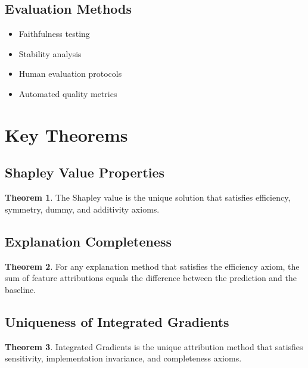 \documentclass[11pt]{article}
\theoremstyle{definition}
\newtheorem{theorem}{Theorem}[section]
\begin{document}
\subsection{Evaluation Methods}
\begin{itemize}
    \item Faithfulness testing
    \item Stability analysis
    \item Human evaluation protocols
    \item Automated quality metrics
\end{itemize}

\section{Key Theorems}

\subsection{Shapley Value Properties}
\begin{theorem}
The Shapley value is the unique solution that satisfies efficiency, symmetry, dummy, and additivity axioms.
\end{theorem}

\subsection{Explanation Completeness}
\begin{theorem}
For any explanation method that satisfies the efficiency axiom, the sum of feature attributions equals the difference between the prediction and the baseline.
\end{theorem}

\subsection{Uniqueness of Integrated Gradients}
\begin{theorem}
Integrated Gradients is the unique attribution method that satisfies sensitivity, implementation invariance, and completeness axioms.
\end{theorem}
\end{document}
